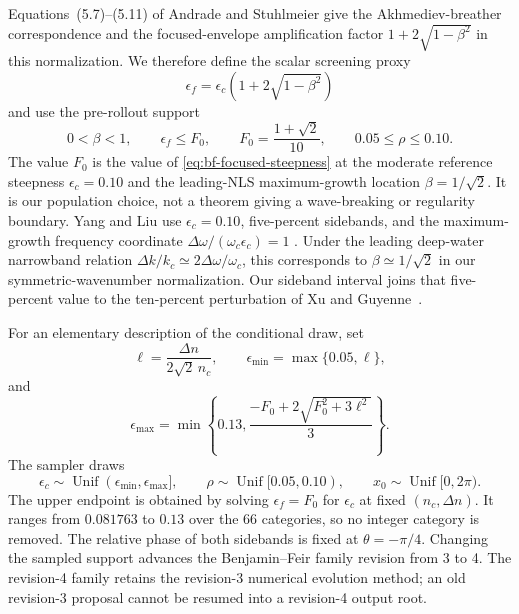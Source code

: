 \documentclass[10pt]{article}
\begin{document}
Equations~(5.7)--(5.11) of Andrade and Stuhlmeier give the
Akhmediev-breather correspondence and the focused-envelope amplification
factor $1+2\sqrt{1-\beta^2}$ in this normalization.  We therefore define the
scalar screening proxy
\begin{equation}
  \epsilon_f
  =\epsilon_c\left(1+2\sqrt{1-\beta^2}\right)
  \label{eq:bf-focused-steepness}
\end{equation}
and use the pre-rollout support
\begin{equation}
  0<\beta<1,\qquad
  \epsilon_f\leq F_0,\qquad
  F_0=\frac{1+\sqrt2}{10},\qquad
  0.05\leq\rho\leq0.10.
  \label{eq:bf-focused-support}
\end{equation}
The value $F_0$ is the value of \eqref{eq:bf-focused-steepness} at the
moderate reference steepness $\epsilon_c=0.10$ and the leading-NLS
maximum-growth location $\beta=1/\sqrt2$.  It is our population choice, not
a theorem giving a wave-breaking or regularity boundary.  Yang and Liu use
$\epsilon_c=0.10$, five-percent sidebands, and the maximum-growth frequency
coordinate $\Delta\omega/(\omega_c\epsilon_c)=1$
\cite[Sec.~4.3.1]{yangliu2024}.  Under the leading deep-water narrowband
relation $\Delta k/k_c\simeq2\Delta\omega/\omega_c$, this corresponds to
$\beta\simeq1/\sqrt2$ in our symmetric-wavenumber normalization.  Our
sideband interval joins that five-percent value to the ten-percent
perturbation of Xu and Guyenne~\cite{xu2009}.

For an elementary description of the conditional draw, set
\[
  \ell=\frac{\Delta n}{2\sqrt2\,n_c},\qquad
  \epsilon_{\min}
  =\max\{0.05,\ell\},
\]
and
\[
  \epsilon_{\max}
  =\min\!\left\{0.13,
    \frac{-F_0+2\sqrt{F_0^2+3\ell^2}}{3}\right\}.
\]
The sampler draws
\[
  \epsilon_c\sim
    \operatorname{Unif}(\epsilon_{\min},\epsilon_{\max}],\qquad
  \rho\sim\operatorname{Unif}[0.05,0.10),\qquad
  x_0\sim\operatorname{Unif}[0,2\pi).
\]
The upper endpoint is obtained by solving $\epsilon_f=F_0$ for
$\epsilon_c$ at fixed $(n_c,\Delta n)$.  It ranges from $0.081763$ to
$0.13$ over the 66 categories, so no integer category is removed.  The
relative phase of both sidebands is fixed at $\theta=-\pi/4$.  Changing the
sampled support advances the Benjamin--Feir family revision from 3 to 4.  The
revision-4 family retains the revision-3 numerical evolution method; an old
revision-3 proposal cannot be resumed into a revision-4 output root.
\end{document}
